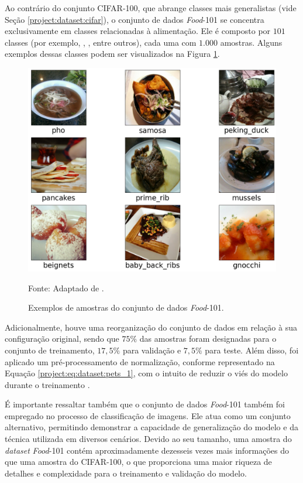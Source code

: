 Ao contrário do conjunto CIFAR-100, que abrange classes mais generalistas (vide Seção \ref{project:dataset:cifar}), o conjunto de dados \textit{Food}-101 se concentra exclusivamente em classes relacionadas à alimentação. Ele é composto por $101$ classes (por exemplo, , , entre outros), cada uma com $1.000$ amostras. Alguns exemplos dessas classes podem ser visualizados na Figura \ref{project:fig:dataset:food}.

\begin{figure}[H]
    \centering
    \caption[Amostras do \textit{Food}-101.]{Exemplos de amostras do conjunto de dados \textit{Food}-101.}
    \label{project:fig:dataset:food}
    \includegraphics[width=1\textwidth]{recursos/imagens/project/food101v2.png}

    Fonte: Adaptado de \cite{Bossard2014Food-101Forests}.
\end{figure}

Adicionalmente, houve uma reorganização do conjunto de dados em relação à sua configuração original, sendo que $75\%$ das amostras foram designadas para o conjunto de treinamento, $17,5\%$ para validação e $7,5\%$ para teste. Além disso, foi aplicado um pré-processamento de normalização, conforme representado na Equação \ref{project:eq:dataset:pets_1}, com o intuito de reduzir o viés do modelo durante o treinamento \citep{Shorten2019ALearning}.

É importante ressaltar também que o conjunto de dados \textit{Food}-101 também foi empregado no processo de classificação de imagens. Ele atua como um conjunto alternativo, permitindo demonstrar a capacidade de generalização do modelo e da técnica utilizada em diversos cenários. Devido ao seu tamanho, uma amostra do \textit{dataset} \textit{Food}-101 contém aproximadamente dezesseis vezes mais informações do que uma amostra do CIFAR-100, o que proporciona uma maior riqueza de detalhes e complexidade para o treinamento e validação do modelo.

